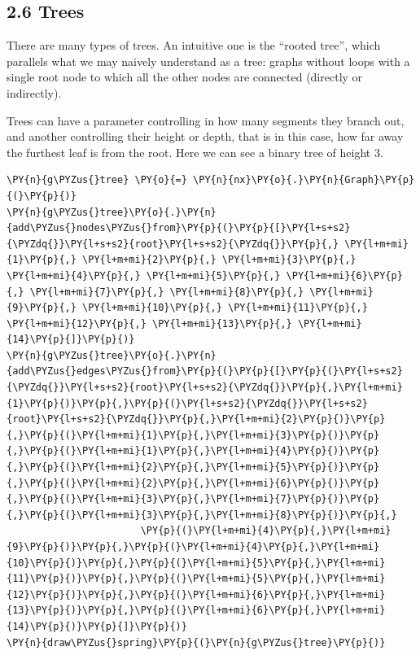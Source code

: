     \hypertarget{trees}{%
\subsection{2.6 Trees}\label{trees}}

There are many types of trees. An intuitive one is the ``rooted tree'',
which parallels what we may naively understand as a tree: graphs without
loops with a single root node to which all the other nodes are connected
(directly or indirectly).

Trees can have a parameter controlling in how many segments they branch
out, and another controlling their height or depth, that is in this
case, how far away the furthest leaf is from the root. Here we can see a
binary tree of height 3.

    \begin{tcolorbox}[breakable, size=fbox, boxrule=1pt, pad at break*=1mm,colback=cellbackground, colframe=cellborder]
\begin{Verbatim}[commandchars=\\\{\}]
\PY{n}{g\PYZus{}tree} \PY{o}{=} \PY{n}{nx}\PY{o}{.}\PY{n}{Graph}\PY{p}{(}\PY{p}{)}
\PY{n}{g\PYZus{}tree}\PY{o}{.}\PY{n}{add\PYZus{}nodes\PYZus{}from}\PY{p}{(}\PY{p}{[}\PY{l+s+s2}{\PYZdq{}}\PY{l+s+s2}{root}\PY{l+s+s2}{\PYZdq{}}\PY{p}{,} \PY{l+m+mi}{1}\PY{p}{,} \PY{l+m+mi}{2}\PY{p}{,} \PY{l+m+mi}{3}\PY{p}{,} \PY{l+m+mi}{4}\PY{p}{,} \PY{l+m+mi}{5}\PY{p}{,} \PY{l+m+mi}{6}\PY{p}{,} \PY{l+m+mi}{7}\PY{p}{,} \PY{l+m+mi}{8}\PY{p}{,} \PY{l+m+mi}{9}\PY{p}{,} \PY{l+m+mi}{10}\PY{p}{,} \PY{l+m+mi}{11}\PY{p}{,} \PY{l+m+mi}{12}\PY{p}{,} \PY{l+m+mi}{13}\PY{p}{,} \PY{l+m+mi}{14}\PY{p}{]}\PY{p}{)}
\PY{n}{g\PYZus{}tree}\PY{o}{.}\PY{n}{add\PYZus{}edges\PYZus{}from}\PY{p}{(}\PY{p}{[}\PY{p}{(}\PY{l+s+s2}{\PYZdq{}}\PY{l+s+s2}{root}\PY{l+s+s2}{\PYZdq{}}\PY{p}{,}\PY{l+m+mi}{1}\PY{p}{)}\PY{p}{,}\PY{p}{(}\PY{l+s+s2}{\PYZdq{}}\PY{l+s+s2}{root}\PY{l+s+s2}{\PYZdq{}}\PY{p}{,}\PY{l+m+mi}{2}\PY{p}{)}\PY{p}{,}\PY{p}{(}\PY{l+m+mi}{1}\PY{p}{,}\PY{l+m+mi}{3}\PY{p}{)}\PY{p}{,}\PY{p}{(}\PY{l+m+mi}{1}\PY{p}{,}\PY{l+m+mi}{4}\PY{p}{)}\PY{p}{,}\PY{p}{(}\PY{l+m+mi}{2}\PY{p}{,}\PY{l+m+mi}{5}\PY{p}{)}\PY{p}{,}\PY{p}{(}\PY{l+m+mi}{2}\PY{p}{,}\PY{l+m+mi}{6}\PY{p}{)}\PY{p}{,}\PY{p}{(}\PY{l+m+mi}{3}\PY{p}{,}\PY{l+m+mi}{7}\PY{p}{)}\PY{p}{,}\PY{p}{(}\PY{l+m+mi}{3}\PY{p}{,}\PY{l+m+mi}{8}\PY{p}{)}\PY{p}{,}
                       \PY{p}{(}\PY{l+m+mi}{4}\PY{p}{,}\PY{l+m+mi}{9}\PY{p}{)}\PY{p}{,}\PY{p}{(}\PY{l+m+mi}{4}\PY{p}{,}\PY{l+m+mi}{10}\PY{p}{)}\PY{p}{,}\PY{p}{(}\PY{l+m+mi}{5}\PY{p}{,}\PY{l+m+mi}{11}\PY{p}{)}\PY{p}{,}\PY{p}{(}\PY{l+m+mi}{5}\PY{p}{,}\PY{l+m+mi}{12}\PY{p}{)}\PY{p}{,}\PY{p}{(}\PY{l+m+mi}{6}\PY{p}{,}\PY{l+m+mi}{13}\PY{p}{)}\PY{p}{,}\PY{p}{(}\PY{l+m+mi}{6}\PY{p}{,}\PY{l+m+mi}{14}\PY{p}{)}\PY{p}{]}\PY{p}{)}
\PY{n}{draw\PYZus{}spring}\PY{p}{(}\PY{n}{g\PYZus{}tree}\PY{p}{)}
\end{Verbatim}
\end{tcolorbox}

